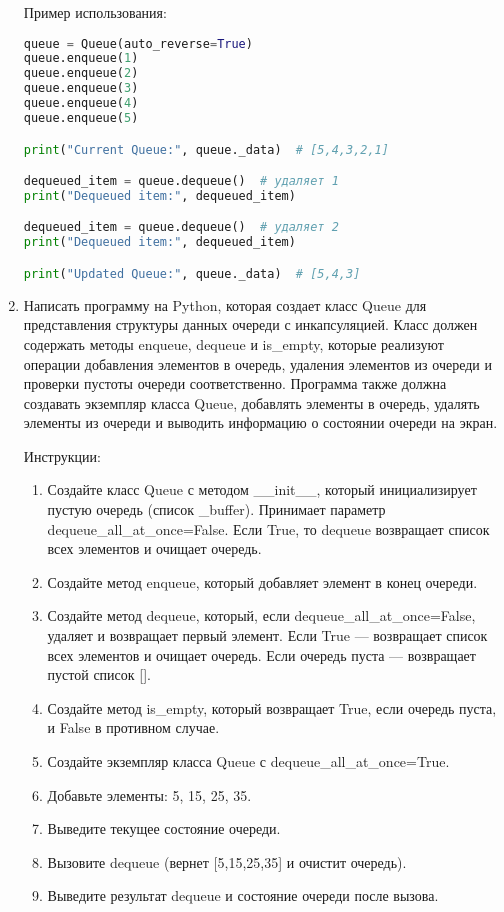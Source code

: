 \begin{enumerate}
Пример использования:
\begin{lstlisting}[language=Python]
queue = Queue(auto_reverse=True)
queue.enqueue(1)
queue.enqueue(2)
queue.enqueue(3)
queue.enqueue(4)
queue.enqueue(5)

print("Current Queue:", queue._data)  # [5,4,3,2,1]

dequeued_item = queue.dequeue()  # удаляет 1
print("Dequeued item:", dequeued_item)

dequeued_item = queue.dequeue()  # удаляет 2
print("Dequeued item:", dequeued_item)

print("Updated Queue:", queue._data)  # [5,4,3]
\end{lstlisting}

\item Написать программу на Python, которая создает класс Queue для представления структуры данных очереди с инкапсуляцией. Класс должен содержать методы enqueue, dequeue и is\_empty, которые реализуют операции добавления элементов в очередь, удаления элементов из очереди и проверки пустоты очереди соответственно. Программа также должна создавать экземпляр класса Queue, добавлять элементы в очередь, удалять элементы из очереди и выводить информацию о состоянии очереди на экран.

Инструкции:
\begin{enumerate}
    \item Создайте класс Queue с методом \_\_init\_\_, который инициализирует пустую очередь (список \_buffer). Принимает параметр dequeue\_all\_at\_once=False. Если True, то dequeue возвращает список всех элементов и очищает очередь.
    \item Создайте метод enqueue, который добавляет элемент в конец очереди.
    \item Создайте метод dequeue, который, если dequeue\_all\_at\_once=False, удаляет и возвращает первый элемент. Если True — возвращает список всех элементов и очищает очередь. Если очередь пуста — возвращает пустой список [].
    \item Создайте метод is\_empty, который возвращает True, если очередь пуста, и False в противном случае.
    \item Создайте экземпляр класса Queue с dequeue\_all\_at\_once=True.
    \item Добавьте элементы: 5, 15, 25, 35.
    \item Выведите текущее состояние очереди.
    \item Вызовите dequeue (вернет [5,15,25,35] и очистит очередь).
    \item Выведите результат dequeue и состояние очереди после вызова.
\end{enumerate}


\end{enumerate}
